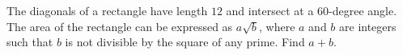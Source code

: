 The diagonals of a rectangle have length $12$ and intersect at a $60$-degree angle. The area of the rectangle can be expressed as $a \sqrt{b}$, where $a$ and $b$ are integers such that $b$ is not divisible by the square of any prime. Find $a + b$.
